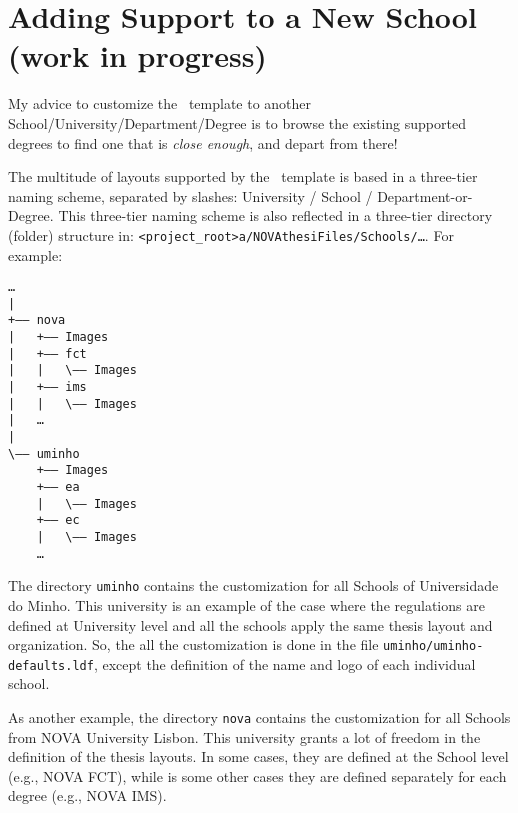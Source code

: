 
%

\chapter{Adding Support to a New School (work in progress)}
\label{cha:porting_novathesis}

My advice to customize the \novathesis\ template to another School/University/Department/Degree is to browse the existing supported degrees to find one that is \emph{close enough}, and depart from there!

The multitude of layouts supported by the \novathesis\ template is based in a three-tier naming scheme, separated by slashes: University / School / Department-or-Degree.  This three-tier naming scheme is also reflected in a three-tier directory (folder) structure in: \verb!<project_root>a/NOVAthesiFiles/Schools/…!.  For example:

\begin{verbatim}
…
| 
+—— nova
|   +—— Images
|   +—— fct
|   |   \—— Images
|   +—— ims
|   |   \—— Images
|   …
|   
\—— uminho
    +—— Images
    +—— ea
    |   \—— Images
    +—— ec
    |   \—— Images
    …
\end{verbatim}

The directory \verb!uminho! contains the customization for all Schools of Universidade do Minho.  This university is an example of the case where the regulations are defined at University level and all the schools apply the same thesis layout and organization.  So, the all the customization is done in the file \verb!uminho/uminho-defaults.ldf!, except the definition of the name and logo of each individual school.

As another example, the directory \verb!nova! contains the customization for all Schools from NOVA University Lisbon. This university grants a lot of freedom in the definition of the thesis layouts.  In some cases, they are defined at the School level (e.g., NOVA FCT), while is some other cases they are defined separately for each degree (e.g., NOVA IMS).





